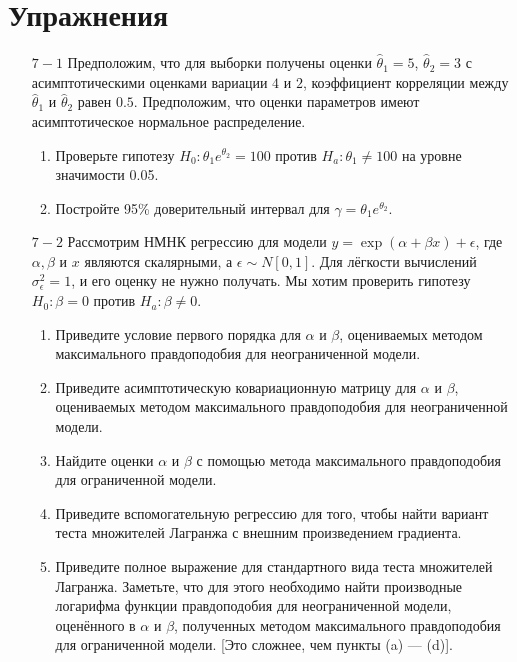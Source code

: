 \section{Упражнения}
\begin{enumerate}

\item [$7-1$] Предположим, что для выборки получены оценки $\hat{\theta}_1 = 5$, $\hat{\theta}_2 = 3$ с асимптотическими оценками вариации $4$ и $2$, коэффициент корреляции между $\hat{\theta}_1$ и $\hat{\theta}_2$  равен $0.5$. Предположим, что оценки параметров имеют асимптотическое нормальное распределение.
\begin{enumerate}
\item Проверьте гипотезу $H_0: \theta_1 e^{\theta_2} = 100$ против $H_a: \theta_1 \not= 100$ на уровне значимости 0.05.
\item Постройте 95\% доверительный интервал для $\gamma = \theta_1 e^{\theta_2}$.
\end{enumerate}
\item [$7-2$] Рассмотрим НМНК регрессию для модели $y = \exp(\alpha + \beta x) + \epsilon$, где $\alpha, \beta$  и $x$ являются скалярными, а $\epsilon \sim N[0,1]$. Для лёгкости вычислений $\sigma_{\epsilon}^2 = 1$, и его оценку не нужно получать. Мы хотим проверить гипотезу $H_0: \beta = 0$ против $H_a: \beta \not= 0$.
\begin{enumerate}
\item Приведите условие первого порядка для $\alpha$ и $\beta$, оцениваемых методом максимального правдоподобия для неограниченной модели.
\item Приведите асимптотическую ковариационную матрицу для $\alpha$ и $\beta$, оцениваемых методом максимального правдоподобия для неограниченной модели.
\item Найдите оценки $\alpha$ и $\beta$ с помощью метода максимального правдоподобия для ограниченной модели.
\item Приведите вспомогательную регрессию для того, чтобы найти вариант теста множителей Лагранжа с внешним произведением градиента.
\item Приведите полное выражение для стандартного вида теста множителей Лагранжа. Заметьте, что для этого необходимо найти производные логарифма функции правдоподобия для неограниченной модели, оценённого в $\alpha$ и $\beta$, полученных методом максимального правдоподобия для ограниченной модели. [Это сложнее, чем пункты (a) --- (d)].
\end{enumerate}

\end{enumerate}
